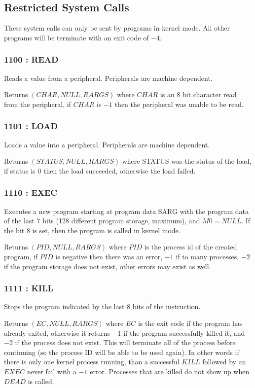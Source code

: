 \documentclass[12pt,letterpaper]{report}
\newcommand{\mem}[3]{\left(#1, #2, #3\right)}
\newcommand{\nil}{NULL}
\begin{document}
\subsection{Restricted System Calls}
These system calls can only be sent by programs in kernel mode. All other programs will be terminate with an exit code of $-4$.
\subsubsection{1100 : READ}
\label{syscall:READ}
Reads a value from a peripheral. Peripherals are machine dependent.

Returns $\mem{CHAR}{\nil}{RARGS}$ where $CHAR$ is an 8 bit character read from the peripheral, if $CHAR$ is $-1$ then the peripheral was unable to be read.
\subsubsection{1101 : LOAD}
\label{syscall:LOAD}
Loads a value into a peripheral. Peripherals are machine dependent.

Returns $\mem{STATUS}{\nil}{RARGS}$ where STATUS was the status of the load, if status is $0$ then the load succeeded, otherwise the load failed.
\subsubsection{1110 : EXEC}
\label{syscall:EXEC}
Executes a new program starting at program data SARG with the program data of the last $7$ bits (128 different program storage, maximum), and $M0=\nil$. If the bit 8 is set, then the program is called in kernel mode.

Returns $\mem{PID}{\nil}{RARGS}$ where $PID$ is the process id of the created program, if $PID$ is negative then there was an error, $-1$ if to many processes, $-2$ if the program storage does not exist, other errors may exist as well.
\subsubsection{1111 : KILL}
\label{syscall:KILL}
Stops the program indicated by the last 8 bits of the instruction.

Returns $\mem{EC}{\nil}{RARGS}$ where $EC$ is the exit code if the program has already exited, otherwise it returns $-1$ if the program successfully killed it, and $-2$ if the process does not exist. This will terminate all of the process before continuing (so the process ID will be able to be used again). In other words if there is only one kernel process running, than a successful $KILL$ followed by an $EXEC$ never fail with a $-1$ error. Processes that are killed do not show up when $DEAD$ is called.
\end{document}
